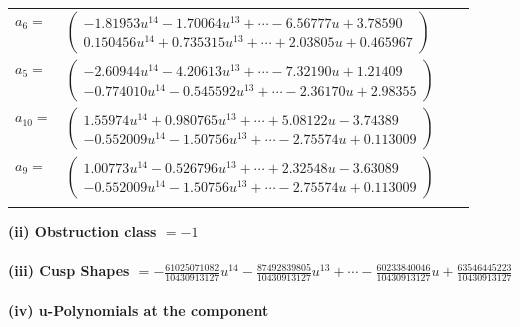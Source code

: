 \documentclass[1p]{elsarticle_modified}
\theoremstyle{definition}
\begin{document}
\begin{tabular}{m{7pt} m{180pt} m{7pt} m{180pt} }
\flushright $a_{6}=$&$\begin{pmatrix}-1.81953 u^{14}-1.70064 u^{13}+\cdots-6.56777 u+3.78590\\0.150456 u^{14}+0.735315 u^{13}+\cdots+2.03805 u+0.465967\end{pmatrix}$ \\
\flushright $a_{5}=$&$\begin{pmatrix}-2.60944 u^{14}-4.20613 u^{13}+\cdots-7.32190 u+1.21409\\-0.774010 u^{14}-0.545592 u^{13}+\cdots-2.36170 u+2.98355\end{pmatrix}$ \\
\flushright $a_{10}=$&$\begin{pmatrix}1.55974 u^{14}+0.980765 u^{13}+\cdots+5.08122 u-3.74389\\-0.552009 u^{14}-1.50756 u^{13}+\cdots-2.75574 u+0.113009\end{pmatrix}$ \\
\flushright $a_{9}=$&$\begin{pmatrix}1.00773 u^{14}-0.526796 u^{13}+\cdots+2.32548 u-3.63089\\-0.552009 u^{14}-1.50756 u^{13}+\cdots-2.75574 u+0.113009\end{pmatrix}$\\&\end{tabular}
\flushleft \textbf{(ii) Obstruction class $= -1$}\\~\\
\flushleft \textbf{(iii) Cusp Shapes $= -\frac{61025071082}{10430913127} u^{14}-\frac{87492839805}{10430913127} u^{13}+\cdots-\frac{60233840046}{10430913127} u+\frac{63546445223}{10430913127}$}\\~\\
\newpage\renewcommand{\arraystretch}{1}
\flushleft \textbf{(iv) u-Polynomials at the component}\newline \\
\end{document}
